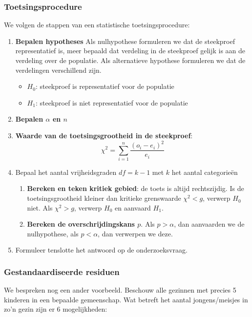 \subsubsection{Toetsingsprocedure}

We volgen de stappen van een statistische toetsingsprocedure:

\begin{enumerate}
  \item \textbf{Bepalen hypotheses}
  Als nulhypothese formuleren we dat de steekproef representatief is, meer bepaald dat verdeling in de steekproef gelijk is aan de verdeling over de populatie. Als alternatieve hypothese formuleren we dat de verdelingen verschillend zijn.
  \begin{itemize}
    \item $H_{0}$: steekproef is representatief voor de populatie
    \item $H_{1}$: steekproef is niet representatief voor de populatie
  \end{itemize}
  \item \textbf{Bepalen $\alpha$ en $n$}
  \item \textbf{Waarde van de toetsingsgrootheid in de steekproef}:
  \[ \chi^{2} = \sum_{i=1}^{n} \frac{(o_{i} - e_{i})^{2}}{e_{i}} \]
  \item Bepaal het aantal vrijheidsgraden $df = k - 1$ met $k$ het aantal categorieën
  \begin{enumerate}
    \item \textbf{Bereken en teken kritiek gebied}: de toets is altijd rechtszijdig. Is de toetsingsgrootheid kleiner dan kritieke grenswaarde $\chi^2 < g$, verwerp $H_{0}$ niet. Als $\chi^2 > g$, verwerp $H_{0}$ en aanvaard $H_{1}$.
    \item \textbf{Bereken de overschrijdingskans $p$}. Als $p > \alpha$, dan aanvaarden we de nulhypothese, als $p < \alpha$, dan verwerpen we deze.
  \end{enumerate}
  \item Formuleer tenslotte het antwoord op de onderzoeksvraag.
\end{enumerate}

\subsubsection{Gestandaardiseerde residuen}

We bespreken nog een ander voorbeeld. Beschouw alle gezinnen met precies 5 kinderen in een bepaalde gemeenschap. Wat betreft het aantal jongens/meisjes in zo'n gezin zijn er 6 mogelijkheden:

